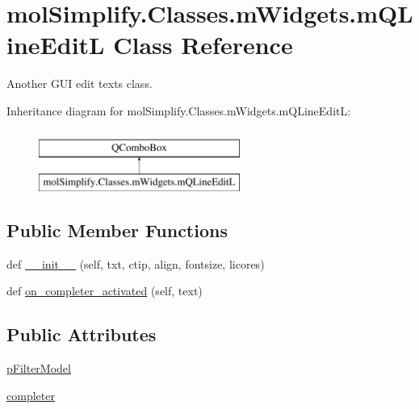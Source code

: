 \hypertarget{classmolSimplify_1_1Classes_1_1mWidgets_1_1mQLineEditL}{}\section{mol\+Simplify.\+Classes.\+m\+Widgets.\+m\+Q\+Line\+EditL Class Reference}
\label{classmolSimplify_1_1Classes_1_1mWidgets_1_1mQLineEditL}


Another G\+UI edit texts class.  


Inheritance diagram for mol\+Simplify.\+Classes.\+m\+Widgets.\+m\+Q\+Line\+EditL\+:\begin{figure}[H]
\begin{center}
\leavevmode
\includegraphics[height=2.000000cm]{classmolSimplify_1_1Classes_1_1mWidgets_1_1mQLineEditL}
\end{center}
\end{figure}
\subsection*{Public Member Functions}
\begin{DoxyCompactItemize}
\item 
def \hyperlink{classmolSimplify_1_1Classes_1_1mWidgets_1_1mQLineEditL_a4ec14adb6debfce9e6c5fefa5a411ed2}{\+\_\+\+\_\+init\+\_\+\+\_\+} (self, txt, ctip, align, fontsize, licores)
\item 
def \hyperlink{classmolSimplify_1_1Classes_1_1mWidgets_1_1mQLineEditL_a0928b280d95373379db84fb7303a9582}{on\+\_\+completer\+\_\+activated} (self, text)
\end{DoxyCompactItemize}
\subsection*{Public Attributes}
\begin{DoxyCompactItemize}
\item 
\hyperlink{classmolSimplify_1_1Classes_1_1mWidgets_1_1mQLineEditL_a97b91fb79b6396c63b495333569300c3}{p\+Filter\+Model}
\item 
\hyperlink{classmolSimplify_1_1Classes_1_1mWidgets_1_1mQLineEditL_a957e9facab3d5870125767a2de4993ec}{completer}
\end{DoxyCompactItemize}


